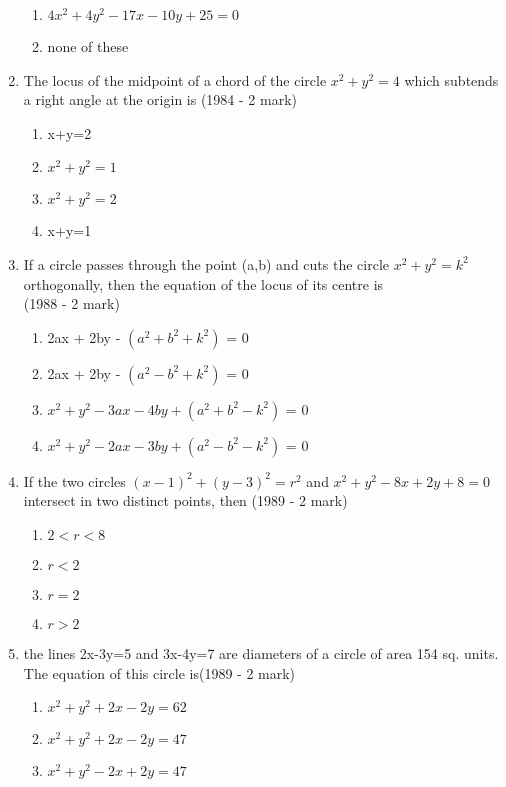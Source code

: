 \documentclass[journal,12pt,twocolumn]{IEEEtran}
\theoremstyle{remark}
\begin{document}
\begin{enumerate}[label=\arabic*.]
\begin{enumerate}[label=(\alph*)]
    \item $4x^{2}+4y^{2}-17x-10y+25=0$
    \item none of these
    \end{enumerate}
    \item The locus of the midpoint of a chord of the circle $x^{2}+y^{2}=4$ which subtends a right angle at the origin is \hfill {(1984 - 2 mark)}
    \begin{enumerate}[label=(\alph*)]
    \item x+y=2
    \item $x^{2}+y^{2}=1$
    \item $x^{2}+y^{2}=2$
    \item x+y=1
    \end{enumerate}
    \item If a circle passes through the point (a,b) and cuts the circle $x^{2}+y^{2}=k^{2}$ orthogonally, then the equation of the locus of its centre is \\
    \hspace*{2in} {(1988 - 2 mark)}
    \begin{enumerate}[label=(\alph*)]
    \item 2ax + 2by - $(a^{2}+b^{2}+k^{2})$ = 0
    \item 2ax + 2by - $(a^{2}-b^{2}+k^{2})$ = 0
    \item $x^{2} + y^{2}-3ax-4by+ (a^{2}+b^{2}-k^{2})$ = 0
    \item $x^{2} + y^{2}-2ax-3by+ (a^{2}-b^{2}-k^{2})$ = 0
    \end{enumerate}
    \item If the two circles $(x-1)^{2} + (y-3)^{2} = r^{2}$ and $x^{2}+y^{2}-8x+2y+8=0$ intersect in two distinct points, then \hfill {(1989 - 2 mark)} 
    \begin{enumerate}[label=(\alph*)]
    \item $2<r<8$
    \item $r<2$
    \item $r=2$
    \item $r>2$
    \end{enumerate}
    \item the lines 2x-3y=5 and 3x-4y=7 are diameters of a circle of area 154 sq. units. The equation of this circle is\hfill {(1989 - 2 mark)}
    \begin{enumerate}[label=(\alph*)]
    \item $x^{2}+y^{2}+2x-2y=62$
    \item $x^{2}+y^{2}+2x-2y=47$
    \item $x^{2}+y^{2}-2x+2y=47$

\end{enumerate}
\end{enumerate}
\end{document}
